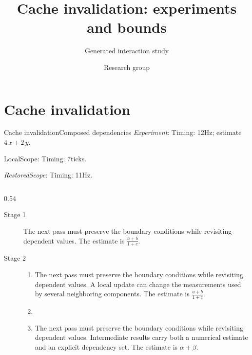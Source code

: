 \documentclass[11pt,aspectratio=43]{beamer}
\title{Cache invalidation: experiments and bounds}
\subtitle{Generated interaction study}
\author{Research group}
\date{}
\newcommand{\fuzzlayerA}[1]{\textit{#1}}
\newcommand{\fuzzlayerB}[1]{\fuzzlayerA{#1}}
\newcommand{\fuzzterm}[1]{\fuzzlayerB{#1}}
\newcommand{\fuzzpair}[2]{\fuzzterm{#1}: #2}
\newcommand{\fuzzunit}{Hz}
\newcommand{\fuzzcoefficient}{4}
\newcommand{\fuzzscale}[2][\fuzzcoefficient]{#1\,#2}
\begin{document}
\section{Cache invalidation}
\begin{frame}[t,shrink=5]{Cache invalidation}{Composed dependencies}
\fuzzpair{Experiment}{Timing: 12\fuzzunit; estimate $\fuzzscale{x}+\fuzzscale[2]{y}$.}\par
{\renewcommand{\fuzzunit}{ticks}\let\fuzzterm\textrm\fuzzpair{LocalScope}{Timing: 7\fuzzunit.}\par}
\fuzzpair{RestoredScope}{Timing: 11\fuzzunit.}\par
\begin{columns}[onlytextwidth,t]
\begin{column}{0.54\textwidth}
\begin{description}
\item[Stage 1] {\small\color{blue}\raggedright
\textrm{The next pass} must preserve the boundary conditions while revisiting dependent values.  The estimate is $\frac{a+b}{1+c}$.\par}
\item[Stage 2] \begin{enumerate}
\item \textrm{The next pass} must preserve the boundary conditions while revisiting dependent values. A local update can change the measurements used by several neighboring components. The estimate is $\frac{a+b}{1+c}$.
\item {}
\item \textrm{The next pass} must preserve the boundary conditions while revisiting dependent values. Intermediate results carry both a numerical estimate and an explicit dependency set. The estimate is $\alpha+\beta$.

\end{enumerate}
\end{description}
\end{column}
\end{columns}
\end{frame}
\end{document}
